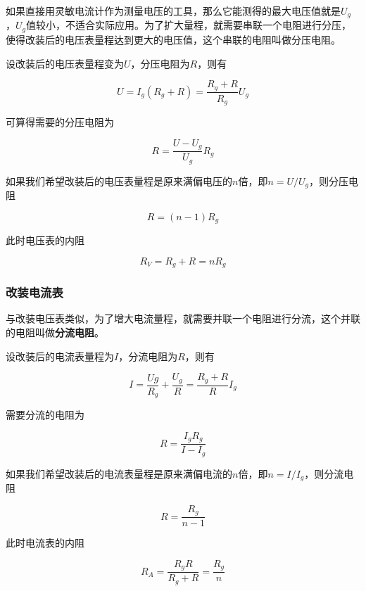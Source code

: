 如果直接用灵敏电流计作为测量电压的工具，那么它能测得的最大电压值就是$U_g$，$U_g$值较小，不适合实际应用。为了扩大量程，就需要串联一个电阻进行分压，使得改装后的电压表量程达到更大的电压值，这个串联的电阻叫做分压电阻。

设改装后的电压表量程变为$U$，分压电阻为$R$，则有

\begin{equation}
U=I_g(R_g+R)=\frac{R_g+R}{R_g}U_g
\end{equation}

可算得需要的分压电阻为

\begin{equation}
R=\frac{U-U_g}{U_g}R_g
\end{equation}

如果我们希望改装后的电压表量程是原来满偏电压的$n$倍，即$n=U/U_g$，则分压电阻

\begin{equation}
R=(n-1)R_g
\end{equation}

此时电压表的内阻

\begin{equation}
R_V=R_g+R=nR_g
\end{equation}

\subsubsection{改装电流表}

与改装电压表类似，为了增大电流量程，就需要并联一个电阻进行分流，这个并联的电阻叫做\textbf{分流电阻}。

设改装后的电流表量程为$I$，分流电阻为$R$，则有

\begin{equation}
I=\frac{Ug}{R_g}+\frac{U_g}{R}=\frac{R_g+R}{R}I_g
\end{equation}

需要分流的电阻为

\begin{equation}
R=\frac{I_gR_g}{I-I_g}
\end{equation}

如果我们希望改装后的电流表量程是原来满偏电流的$n$倍，即$n=I/I_g$，则分流电阻

\begin{equation}
R=\frac{R_g}{n-1}
\end{equation}

此时电流表的内阻

\begin{equation}
R_A=\frac{R_gR}{R_g+R}=\frac{R_g}{n}
\end{equation}
